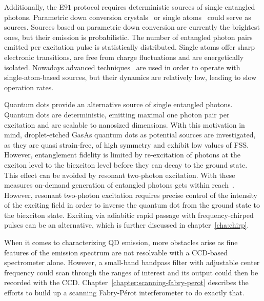 Additionally, the E$91$ protocol requires deterministic sources of single entangled photons.
Parametric down conversion crystals~\cite{shih_new_1988} or single atoms~\cite{aspect_experimental_1981} could serve as sources.
Sources based on parametric down conversion are currently the brightest ones, but their emission is probabilistic.
The number of entangled photon pairs emitted per excitation pulse is statistically distributed.
Single atoms offer sharp electronic transitions, are free from charge fluctuations and are energetically isolated.
Nowadays advanced techniques~\cite{kuhn_deterministic_2002} are used in order to operate with single-atom-based sources, but their dynamics are relatively low, leading to slow operation rates.

Quantum dots provide an alternative source of single entangled photons.
Quantum dots are deterministic, emitting maximal one photon pair per excitation and are scalable to nanosized dimensions.
With this motivation in mind, droplet-etched GasAs quantum dots as potential sources are investigated, as they are quasi strain-free, of high symmetry and exhibit low values of \ac{FSS}.
However, entanglement fidelity is limited by re-excitation of photons at the exciton level to the biexciton level before they can decay to the ground state. 
This effect can be avoided by resonant two-photon excitation.
With these measures on-demand generation of entangled photons gets within reach~\cite{jayakumar_deterministic_2013}.
However, resonant two-photon excitation requires precise control of the intensity of the exciting field in order to inverse the quantum dot from the ground state to the biexciton state.
Exciting via adiabitic rapid passage with frequency-chirped pulses can be an alternative, which is further discussed in chapter~\ref{cha:chirp}.

When it comes to characterizing \ac{QD} emission, more obstacles arise as fine features of the emission spectrum are not resolvable with a CCD-based spectrometer alone.
However, a small-band bandpass filter with adjustable center frequency could scan through the ranges of interest and its output could then be recorded with the CCD.
Chapter~\ref{chapter:scanning-fabry-perot} describes the efforts to build up a scanning Fabry-Pérot interferometer to do exactly that. 


